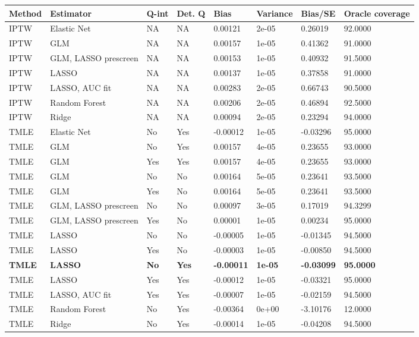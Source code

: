 
\begin{longtable}[l]{llllllll}
\toprule
Method & Estimator & Q-int & Det. Q & Bias & Variance & Bias/SE & Oracle coverage\\
\midrule
IPTW & Elastic Net & NA & NA & 0.00121 & 2e-05 & 0.26019 & 92.0000\\
IPTW & GLM & NA & NA & 0.00157 & 1e-05 & 0.41362 & 91.0000\\
IPTW & GLM, LASSO prescreen & NA & NA & 0.00153 & 1e-05 & 0.40932 & 91.5000\\
IPTW & LASSO & NA & NA & 0.00137 & 1e-05 & 0.37858 & 91.0000\\
IPTW & LASSO, AUC fit & NA & NA & 0.00283 & 2e-05 & 0.66743 & 90.5000\\
IPTW & Random Forest & NA & NA & 0.00206 & 2e-05 & 0.46894 & 92.5000\\
IPTW & Ridge & NA & NA & 0.00094 & 2e-05 & 0.23294 & 94.0000\\
TMLE & Elastic Net & No & Yes & -0.00012 & 1e-05 & -0.03296 & 95.0000\\
TMLE & GLM & No & Yes & 0.00157 & 4e-05 & 0.23655 & 93.0000\\
TMLE & GLM & Yes & Yes & 0.00157 & 4e-05 & 0.23655 & 93.0000\\
TMLE & GLM & No & No & 0.00164 & 5e-05 & 0.23641 & 93.5000\\
TMLE & GLM & Yes & No & 0.00164 & 5e-05 & 0.23641 & 93.5000\\
TMLE & GLM, LASSO prescreen & No & No & 0.00097 & 3e-05 & 0.17019 & 94.3299\\
TMLE & GLM, LASSO prescreen & Yes & No & 0.00001 & 1e-05 & 0.00234 & 95.0000\\
TMLE & LASSO & No & No & -0.00005 & 1e-05 & -0.01345 & 94.5000\\
TMLE & LASSO & Yes & No & -0.00003 & 1e-05 & -0.00850 & 94.5000\\
\midrule
\textbf{TMLE} & \textbf{LASSO} & \textbf{No} & \textbf{Yes} & \textbf{-0.00011} & \textbf{1e-05} & \textbf{-0.03099} & \textbf{95.0000}\\
\midrule
TMLE & LASSO & Yes & Yes & -0.00012 & 1e-05 & -0.03321 & 95.0000\\
TMLE & LASSO, AUC fit & Yes & Yes & -0.00007 & 1e-05 & -0.02159 & 94.5000\\
TMLE & Random Forest & No & Yes & -0.00364 & 0e+00 & -3.10176 & 12.0000\\
TMLE & Ridge & No & Yes & -0.00014 & 1e-05 & -0.04208 & 94.5000\\
\bottomrule
\end{longtable}
